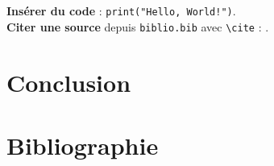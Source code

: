 \documentclass{rapportECL}
\begin{document}
\textbf{Insérer du code} : \texttt{print("Hello, World!")}.\\

\textbf{Citer une source} depuis \texttt{biblio.bib} avec
\texttt{\textbackslash cite} : \cite{exemple_de_source}.\\

\section*{Conclusion}

\newpage
\section*{Bibliographie}

\printbibliography[heading=none]
\end{document}
